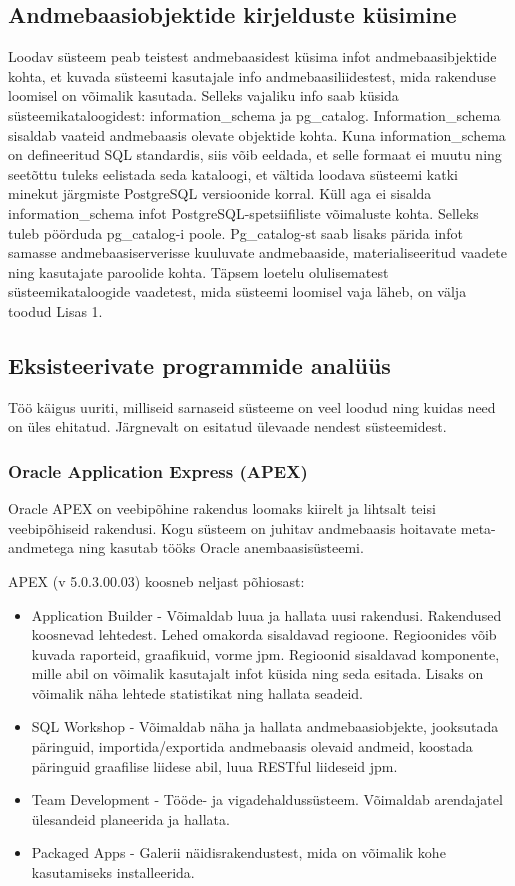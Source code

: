 \documentclass[a4paper,12pt]{article} %
\begin{document}
\subsection{Andmebaasiobjektide kirjelduste küsimine}
\label{andmebaasi_objektide_kirjelduste_küsimine}
Loodav süsteem peab teistest andmebaasidest küsima infot andmebaasibjektide kohta, et kuvada süsteemi kasutajale info andmebaasiliidestest, mida rakenduse loomisel on võimalik kasutada. Selleks vajaliku info saab küsida süsteemikataloogidest: information\_schema ja pg\_catalog.
Information\_schema sisaldab vaateid andmebaasis olevate objektide kohta. Kuna information\_schema on defineeritud SQL standardis, siis võib eeldada, et selle formaat ei muutu ning seetõttu tuleks eelistada seda kataloogi, et vältida loodava süsteemi katki minekut  järgmiste PostgreSQL versioonide korral. \cite{PostgreSQLInformationSchema} Küll aga ei sisalda information\_schema infot PostgreSQL-spetsiifiliste võimaluste kohta. Selleks tuleb pöörduda pg\_catalog-i poole. Pg\_catalog-st saab lisaks pärida infot samasse andmebaasiserverisse kuuluvate andmebaaside, materialiseeritud vaadete ning kasutajate paroolide kohta. \cite{PostgreSQLSystemCatalogs} Täpsem loetelu olulisematest süsteemikataloogide vaadetest, mida süsteemi loomisel vaja läheb, on välja toodud Lisas 1.

\subsection{Eksisteerivate programmide analüüs}
Töö käigus uuriti, milliseid sarnaseid süsteeme on veel loodud ning kuidas need on üles ehitatud. Järgnevalt on esitatud ülevaade nendest süsteemidest.
\subsubsection{Oracle Application Express (APEX)}
Oracle APEX on veebipõhine rakendus loomaks kiirelt ja lihtsalt teisi veebipõhiseid rakendusi. Kogu süsteem on juhitav andmebaasis hoitavate meta-andmetega ning kasutab tööks Oracle anembaasisüsteemi.\par
APEX (v 5.0.3.00.03) koosneb neljast põhiosast:
\begin{itemize}
\item Application Builder - Võimaldab luua ja hallata uusi rakendusi. Rakendused koosnevad lehtedest. Lehed omakorda sisaldavad regioone. Regioonides võib kuvada raporteid, graafikuid, vorme jpm. Regioonid sisaldavad komponente, mille abil on võimalik kasutajalt infot küsida ning seda esitada. Lisaks on võimalik näha lehtede statistikat ning hallata seadeid.
\item SQL Workshop - Võimaldab näha ja hallata andmebaasiobjekte, jooksutada päringuid, importida/exportida andmebaasis olevaid andmeid, koostada päringuid graafilise liidese abil, luua RESTful liideseid jpm.
\item Team Development - Tööde- ja vigadehaldussüsteem. Võimaldab arendajatel ülesandeid planeerida ja hallata.
\item Packaged Apps - Galerii näidisrakendustest, mida on võimalik kohe kasutamiseks installeerida.
\end{itemize}
\cite{Oracle_APEX}
\end{document}
